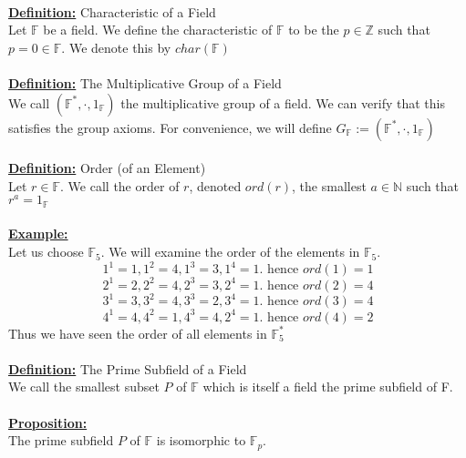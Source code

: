\documentclass[11pt]{article}
\theoremstyle{plain}
\theoremstyle{definition}
\begin{document}
\\
\textbf{\underline{Definition:}} Characteristic of a Field \\
Let $\mathbb{F}$ be a field. We define the characteristic of $\mathbb{F}$ to be the $p \in \mathbb{Z}$ such that $p=0 \in \mathbb{F}$. We denote this by $char(\mathbb{F})$\\
\\
\textbf{\underline{Definition:}} The Multiplicative Group of a Field \\
We call $( \mathbb{F} ^{*}, \cdot, 1_\mathbb{F} )$ the multiplicative group of a field. We can verify that this satisfies the group axioms. For convenience, we will define $G_\mathbb{F} := ( \mathbb{F} ^{*}, \cdot, 1_\mathbb{F} )$\\
\\
\textbf{\underline{Definition:}} Order (of an Element) \\
Let $r \in \mathbb{F}$. We call the order of $r$, denoted $ord(r)$, the smallest $a \in \mathbb{N}$ such that $r^a = 1_{\mathbb{F}}$\\
\\
\textbf{\underline{Example:}}\\
Let us choose $\mathbb{F}_{5}$. We will examine the order of the elements in $\mathbb{F}_5$. 
\begin{equation*}
1^1 = 1, 1^2 = 4, 1^3 = 3, 1^4=1. \text{ hence } ord(1)=1
\end{equation*}
\begin{equation*}
2^1 = 2, 2^2 = 4, 2^3 = 3, 2^4=1. \text{ hence } ord(2)=4
\end{equation*}
\begin{equation*}
3^1 = 3, 3^2 = 4, 3^3 = 2, 3^4=1. \text{ hence } ord(3)=4
\end{equation*}
\begin{equation*}
4^1 = 4, 4^2 = 1, 4^3 = 4, 2^4=1. \text{ hence } ord(4)=2
\end{equation*}
Thus we have seen the order of all elements in $\mathbb{F}_5 ^*$\\
\\
\textbf{\underline{Definition:}} The Prime Subfield of a Field \\
We call the smallest subset $P$ of $\mathbb{F}$ which is itself a field the prime subfield of F.\\
\\
\textbf{\underline{Proposition:}} \\
The prime subfield $P$ of $\mathbb{F}$ is isomorphic to $\mathbb{F}_p$. \\
\end{document}
